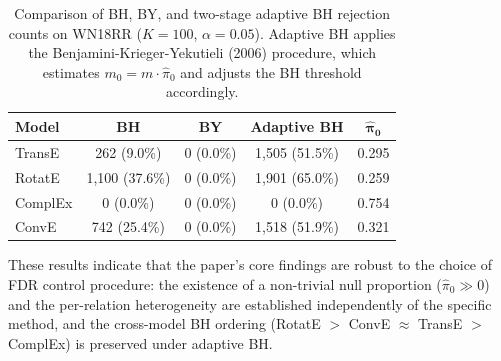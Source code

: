 \begin{table}[h]
\centering
\caption{Comparison of BH, BY, and two-stage adaptive BH rejection counts on WN18RR ($K=100$, $\alpha = 0.05$). Adaptive BH applies the Benjamini-Krieger-Yekutieli (2006) procedure, which estimates $m_0 = m \cdot \hat{\pi}_0$ and adjusts the BH threshold accordingly.}
\label{tab:sensitivity-adapt}
\begin{tabular}{lcccc}
\toprule
\textbf{Model} & \textbf{BH} & \textbf{BY} & \textbf{Adaptive BH} & $\boldsymbol{\hat{\pi}_0}$ \\
\midrule
TransE   & 262 (9.0\%)  & 0 (0.0\%) & 1{,}505 (51.5\%) & 0.295 \\
RotatE   & 1{,}100 (37.6\%) & 0 (0.0\%) & 1{,}901 (65.0\%) & 0.259 \\
ComplEx  & 0 (0.0\%)   & 0 (0.0\%) & 0 (0.0\%)       & 0.754 \\
ConvE    & 742 (25.4\%) & 0 (0.0\%) & 1{,}518 (51.9\%) & 0.321 \\
\bottomrule
\end{tabular}
\end{table}

These results indicate that the paper's core findings are robust to the choice of FDR control procedure: the existence of a non-trivial null proportion ($\hat{\pi}_0 \gg 0$) and the per-relation heterogeneity are established independently of the specific method, and the cross-model BH ordering (RotatE $>$ ConvE $\approx$ TransE $>$ ComplEx) is preserved under adaptive BH.
